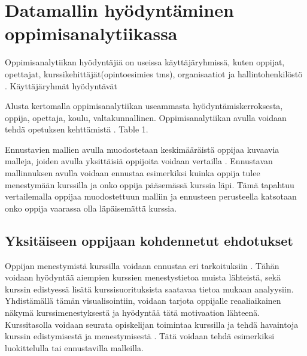 \chapter{Datamallin hyödyntäminen oppimisanalytiikassa\label{hyodyntaminen}}

Oppimisanalytiikan hyödyntäjiä on useissa käyttäjäryhmissä, kuten oppijat, opettajat, kurssikehittäjät(opintoesimies tms), organisaatiot ja hallintohenkilöstö \citep{romeroEducationalDataMining2010}. Käyttäjäryhmät hyödyntävät

\color{red} Alusta kertomalla oppimisanalytiikan useammasta hyödyntämiskerroksesta, oppija, opettaja, koulu, valtakunnallinen. Oppimisanalytiikan avulla voidaan tehdä opetuksen kehttämistä \citep{romeroEducationalDataMining2010}. Table 1. \color{black}

Ennustavien mallien avulla muodostetaan keskimääräistä oppijaa kuvaavia malleja, joiden avulla yksittäisiä oppijoita voidaan vertailla \citep{wolffImprovingRetentionPredicting2013}. Ennustavan mallinnuksen avulla voidaan ennustaa esimerkiksi kuinka oppija tulee menestymään kurssilla ja onko oppija pääsemässä kurssia läpi. Tämä tapahtuu vertailemalla oppijaa muodostettuun malliin ja ennusteen perusteella katsotaan onko oppija vaarassa olla läpäisemättä kurssia.

\section{Yksitäiseen oppijaan kohdennetut ehdotukset}


\color{blue}
Oppijan menestymistä kurssilla voidaan ennustaa eri tarkoituksiin \citep{barberCourseCorrectionUsing2012a}. Tähän voidaan hyödyntää aiempien kurssien menestystietoa muista lähteistä, sekä kurssin edistyessä lisätä kurssisuorituksista saatavaa tietoa mukaan analyysiin. Yhdistämällä tämän visualisointiin, voidaan tarjota oppijalle reaaliaikainen näkymä kurssimenestyksestä ja hyödyntää tätä motivaation lähteenä. Kurssitasolla voidaan seurata opiskelijan toimintaa kurssilla ja tehdä havaintoja kurssin edistymisestä ja menestymisestä \citep{longPenetratingFogAnalytics2011,siemensLearningAnalyticsEmergence2013}. Tätä voidaan tehdä esimerkiksi luokittelulla tai ennustavilla malleilla.

